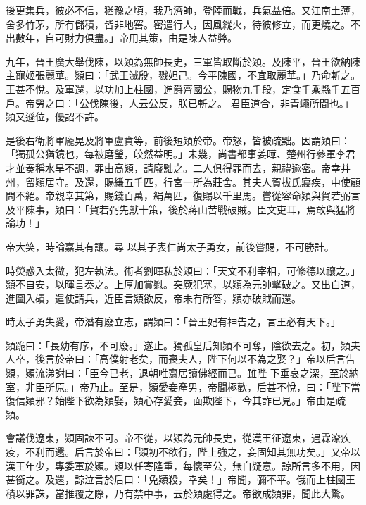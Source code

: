 \begin{pinyinscope}
 後更集兵，彼必不信，猶豫之頃，我乃濟師，登陸而戰，兵氣益倍。又江南土薄，舍多竹茅，所有儲積，皆非地窖。密遣行人，因風縱火，待彼修立，而更燒之。不出數年，自可財力俱盡。」帝用其策，由是陳人益弊。



 九年，晉王廣大舉伐陳，以熲為無帥長史，三軍皆取斷於熲。及陳平，晉王欲納陳主寵姬張麗華。熲曰：「武王滅殷，戮妲己。今平陳國，不宜取麗華。」乃命斬之。王甚不悅。及軍還，以功加上柱國，進爵齊國公，賜物九千段，定食千乘縣千五百戶。帝勞之曰：「公伐陳後，人云公反，朕已斬之。
 君臣道合，非青蠅所間也。」熲又遜位，優詔不許。



 是後右衛將軍龐晃及將軍盧賁等，前後短熲於帝。帝怒，皆被疏黜。因謂熲曰：「獨孤公猶鏡也，每被磨瑩，皎然益明。」未幾，尚書都事姜曄、楚州行參軍李君才並奏稱水旱不調，罪由高熲，請廢黜之。二人俱得罪而去，親禮逾密。帝幸并州，留熲居守。及還，賜縑五千匹，行宮一所為莊舍。其夫人賀拔氏寢疾，中使顧問不絕。帝親幸其第，賜錢百萬，絹萬匹，復賜以千里馬。嘗從容命熲與賀若弼言及平陳事，熲曰：「賀若弼先獻十策，後於蔣山苦戰破賊。臣文吏耳，焉敢與猛將論功！」



 帝大笑，時論嘉其有讓。尋
 以其子表仁尚太子勇女，前後嘗賜，不可勝計。



 時熒惑入太微，犯左執法。術者劉暉私於熲曰：「天文不利宰相，可修德以禳之。」熲不自安，以暉言奏之。上厚加賞慰。突厥犯塞，以熲為元帥擊破之。又出白道，進圖入磧，遣使請兵，近臣言熲欲反，帝未有所答，熲亦破賊而還。



 時太子勇失愛，帝潛有廢立志，謂熲曰：「晉王妃有神告之，言王必有天下。」



 熲跪曰：「長幼有序，不可廢。」遂止。獨孤皇后知熲不可奪，陰欲去之。初，熲夫人卒，後言於帝曰：「高僕射老矣，而喪夫人，陛下何以不為之娶？」帝以后言告熲，熲流涕謝曰：「臣今已老，退朝唯齋居讀佛經而已。雖陛
 下垂哀之深，至於納室，非臣所原。」帝乃止。至是，熲愛妾產男，帝聞極歡，后甚不悅，曰：「陛下當復信熲邪？始陛下欲為熲娶，熲心存愛妾，面欺陛下，今其詐已見。」帝由是疏熲。



 會議伐遼東，熲固諫不可。帝不從，以熲為元帥長史，從漢王征遼東，遇霖潦疾疫，不利而還。后言於帝曰：「熲初不欲行，陛上強之，妾固知其無功矣。」又帝以漢王年少，專委軍於熲。熲以任寄隆重，每懷至公，無自疑意。諒所言多不用，因甚銜之。及還，諒泣言於后曰：「免熲殺，幸矣！」帝聞，彌不平。俄而上柱國王積以罪誅，當推覆之際，乃有禁中事，云於熲處得之。帝欲成熲罪，聞此大驚。




\end{pinyinscope}
